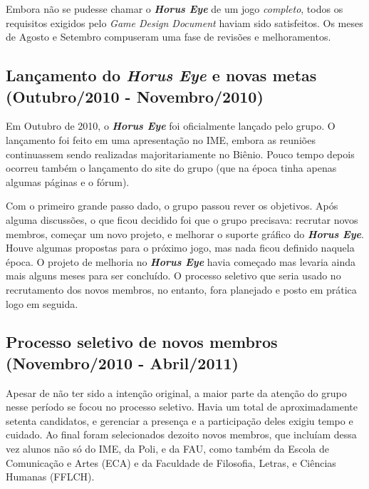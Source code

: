 \documentclass[12pt,onecolumn,a4paper]{article}
\begin{document}
        Embora não se pudesse chamar o \textit{\textbf{Horus Eye}} de um jogo \textit{completo},
        todos os requisitos exigidos pelo \textit{Game Design Document} haviam sido satisfeitos. Os
        meses de Agosto e Setembro compuseram uma fase de revisões e melhoramentos.

    \clearpage
    \subsection{Lançamento do \textit{\textbf{Horus Eye}} e novas metas \\
                {\small(Outubro/2010 - Novembro/2010)} }
        Em Outubro de 2010, o \textit{\textbf{Horus Eye}} foi oficialmente lançado pelo grupo. O
        lançamento foi feito em uma apresentação no IME, embora as reuniões continuassem
        sendo realizadas majoritariamente no Biênio. Pouco tempo depois ocorreu também o lançamento
        do site do grupo (que na época tinha apenas algumas páginas e o fórum).
        
        Com o primeiro grande passo dado, o grupo passou rever os objetivos. Após alguma discussões,
        o que ficou decidido foi que o grupo precisava: recrutar novos membros, começar um novo
        projeto, e melhorar o suporte gráfico do \textit{\textbf{Horus Eye}}. Houve algumas
        propostas para o próximo jogo, mas nada ficou definido naquela época. O projeto de melhoria
        no \textit{\textbf{Horus Eye}} havia começado mas levaria ainda mais alguns meses para ser
        concluído. O processo seletivo que seria usado no recrutamento dos novos membros, no
        entanto, fora planejado e posto em prática logo em seguida.

    \clearpage
    \subsection{Processo seletivo de novos membros \\
                {\small(Novembro/2010 - Abril/2011)} }
        Apesar de não ter sido a intenção original, a maior parte da atenção do grupo nesse período
        se focou no processo seletivo. Havia um total de aproximadamente setenta candidatos, e
        gerenciar a presença e a participação deles exigiu tempo e cuidado. Ao final foram
        selecionados dezoito novos membros, que incluíam dessa vez alunos não só do IME, da Poli, e
        da FAU, como também da Escola de Comunicação e Artes (ECA) e da Faculdade de Filosofia,
        Letras, e Ciências Humanas (FFLCH).
        
\end{document}
